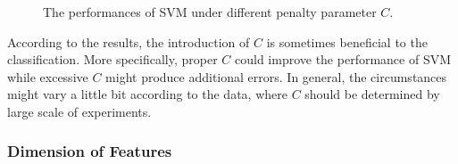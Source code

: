 \documentclass[12pt,a4paper]{article}
\theoremstyle{definition}
\begin{document}
\begin{figure}[H]
	\centering
	\caption{The performances of SVM under different penalty parameter $C$.}
	\label{fig:svm-penalty}
\end{figure}

According to the results, the introduction of $C$ is sometimes beneficial to the classification. More specifically, proper $C$ could improve the performance of SVM while excessive $C$ might produce additional errors. In general, the circumstances might vary a little bit according to the data, where $C$ should be determined by large scale of experiments.

\subsubsection{Dimension of Features}
\end{document}
